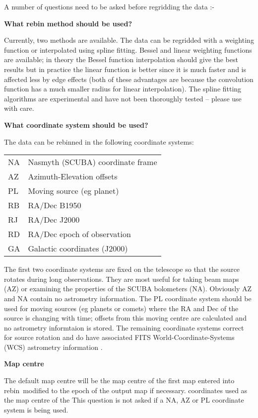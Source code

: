\documentclass[twoside,11pt]{article}
\newcommand{\task}[1]{{\sf #1}}
\newcommand{\rebin}{\htmlref{\task{rebin}}{REBIN}}
\newcommand{\htmlref}[2]{#1}
\begin{document}
A number of questions need to be asked before regridding the data :-
\begin{description}
\item {\bf What rebin method should be used?}

Currently, two methods are available. The data can be regridded with a
weighting function or interpolated using spline fitting.  Bessel and linear
weighting functions are available; in theory the Bessel function interpolation
should give the best results but in practice the linear function is better
since it is much faster and is affected less by edge effects (both of these
advantages are because the convolution function has a much smaller radius for
linear interpolation). The spline fitting algorithms are experimental and have
not been thoroughly tested -- please use with care.

\item {\bf What coordinate system should be used?}

The data can be rebinned in the following coordinate systems:

\begin{tabular}{ll}
NA & Nasmyth (SCUBA) coordinate frame\\
AZ & Azimuth-Elevation offsets\\
PL & Moving source (eg planet) \\
RB & RA/Dec B1950 \\
RJ & RA/Dec J2000 \\
RD & RA/Dec epoch of observation\\
GA & Galactic coordinates (J2000) \\
\end{tabular}

The first two coordinate systems are fixed on the telescope so that the source
rotates during long observations. They are most useful for taking beam maps
(AZ) or examining the properties of the SCUBA bolometers (NA). Obviously AZ
and NA contain no astrometry information. The PL coordinate system should be
used for moving sources (eg planets or comets) where the RA and Dec of the
source is changing with time; offsets from this moving centre are calculated
and no astrometry informtaion is stored.  The remaining coordinate systems
correct for source rotation and do have associated FITS
World-Coordinate-Systems (WCS) astrometry information \cite{WCS}.

\item {\bf Map centre}

The default map centre will be the map centre of the first map entered into
\rebin\ modified to the epoch of the output map if necessary.  coordinates
used as the map centre of the This question is not asked if a NA, AZ or PL
coordinate system is being used.


\end{description}
\end{document}
